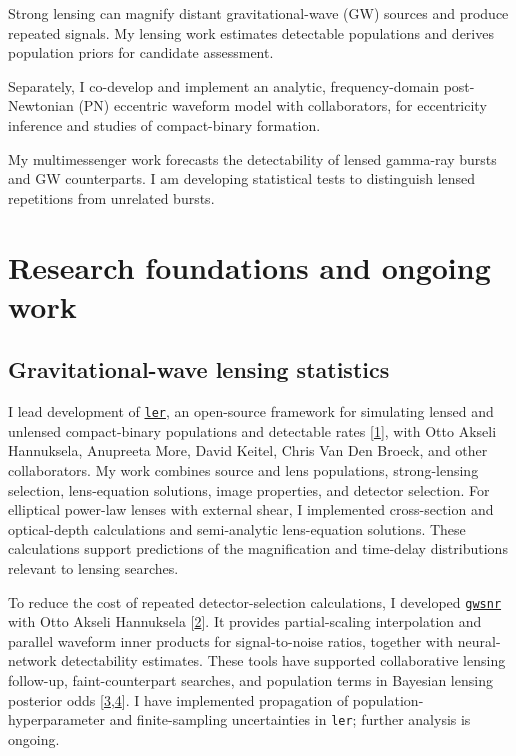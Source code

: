 \documentclass[11pt]{article}
\begin{document}

Strong lensing can magnify distant gravitational-wave (GW) sources and produce repeated signals. My lensing work estimates detectable populations and derives population priors for candidate assessment.

Separately, I co-develop and implement an analytic, frequency-domain post-Newtonian (PN) eccentric waveform model with collaborators, for eccentricity inference and studies of compact-binary formation.

My multimessenger work forecasts the detectability of lensed gamma-ray bursts and GW counterparts. I am developing statistical tests to distinguish lensed repetitions from unrelated bursts.

\section*{Research foundations and ongoing work}
\subsection*{Gravitational-wave lensing statistics}
I lead development of \href{https://ler.hemantaph.com/}{\texttt{ler}}, an open-source framework for simulating lensed and unlensed compact-binary populations and detectable rates [\hyperlink{ref1}{1}], with Otto Akseli Hannuksela, Anupreeta More, David Keitel, Chris Van Den Broeck, and other collaborators. My work combines source and lens populations, strong-lensing selection, lens-equation solutions, image properties, and detector selection. For elliptical power-law lenses with external shear, I implemented cross-section and optical-depth calculations and semi-analytic lens-equation solutions. These calculations support predictions of the magnification and time-delay distributions relevant to lensing searches.

To reduce the cost of repeated detector-selection calculations, I developed \href{https://gwsnr.hemantaph.com/}{\texttt{gwsnr}} with Otto Akseli Hannuksela [\hyperlink{ref2}{2}]. It provides partial-scaling interpolation and parallel waveform inner products for signal-to-noise ratios, together with neural-network detectability estimates. These tools have supported collaborative lensing follow-up, faint-counterpart searches, and population terms in Bayesian lensing posterior odds [\hyperlink{ref3}{3},\hyperlink{ref4}{4}]. I have implemented propagation of population-hyperparameter and finite-sampling uncertainties in \texttt{ler}; further analysis is ongoing.
\end{document}
